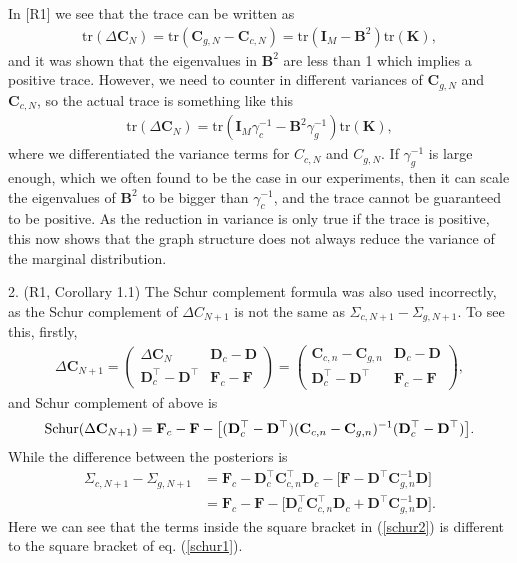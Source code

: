 \documentclass[11pt,onecolumn,journal]{IEEEtran}
\theoremstyle{definition}
\begin{document}
In [R1] we see that the trace can be written as
\begin{align}
    \text{tr}(\Delta \mathbf{C}_N) = \text{tr}(\mathbf{C}_{g,N} - \mathbf{C}_{c,N}) = \text{tr}(\mathbf{I}_M - \mathbf{B}^2) \text{tr} (\mathbf{K}),
\end{align}
and it was shown that the eigenvalues in $\mathbf{B}^2$ are less than 1 which implies a positive trace. However, we need to counter in different variances of $\mathbf{C}_{g,N}$ and $\mathbf{C}_{c,N}$, so the actual trace is something like this
\begin{align}
    \text{tr}(\Delta \mathbf{C}_N) = \text{tr}(\mathbf{I}_M\gamma^{-1}_c - \mathbf{B}^2\gamma^{-1}_g) \text{tr} (\mathbf{K}),
\end{align}
where we differentiated the variance terms for $C_{c,N}$ and $C_{g,N}$. If $\gamma_g^{-1}$ is large enough, which we often found to be the case in our experiments, then it can scale the eigenvalues of $\mathbf{B}^2$ to be bigger than $\gamma_c^{-1}$, and the trace cannot be guaranteed to be positive. As the reduction in variance is only true if the trace is positive, this now shows that the graph structure does not always reduce the variance of the marginal distribution.

2. (R1, Corollary 1.1) The Schur complement formula was also used incorrectly, as the Schur complement of $\Delta C_{N+1}$ is not the same as $\Sigma_{c, N+1} - \Sigma_{g,N+1}$. To see this, firstly,
\begin{align}
    \Delta \mathbf{C}_{N+1} = \begin{pmatrix}
    \Delta \mathbf{C}_N & \mathbf{D}_c - \mathbf{D} \\
    \mathbf{D}_c^\top - \mathbf{D}^\top & \mathbf{F}_c - \mathbf{F}
    \end{pmatrix} = \begin{pmatrix}
    \mathbf{C}_{c,n} - \mathbf{C}_{g,n} & \mathbf{D}_c - \mathbf{D} \\
    \mathbf{D}_c^\top - \mathbf{D}^\top & \mathbf{F}_c - \mathbf{F}
    \end{pmatrix},
\end{align}
and Schur complement of above is
\begin{align}
    \textmd{Schur}(\Delta \mathbf{C}_{N+1}) = \mathbf{F}_c - \mathbf{F} - \big[(\mathbf{D}_c^\top - \mathbf{D}^\top)(\mathbf{C}_{c,n} - \mathbf{C}_{g,n})^{-1} (\mathbf{D}_c^\top - \mathbf{D}^\top)\big]. \label{schur1}
\end{align}
While the difference between the posteriors is
\begin{align}
    \Sigma_{c, N+1} - \Sigma_{g,N+1} &= \mathbf{F}_c - \mathbf{D}_c^\top \mathbf{C}_{c,n}^\top \mathbf{D}_c - \big[ \mathbf{F} - \mathbf{D}^\top \mathbf{C}_{g,n}^{-1} \mathbf{D} \big] \\
    &= \mathbf{F}_c - \mathbf{F} - \big[ \mathbf{D}_c^\top \mathbf{C}_{c,n}^\top \mathbf{D}_c + \mathbf{D}^\top \mathbf{C}_{g,n}^{-1} \mathbf{D} \big]. \label{schur2}
\end{align}
Here we can see that the terms inside the square bracket in (\ref{schur2}) is different to the square bracket of eq. (\ref{schur1}).
\end{document}
